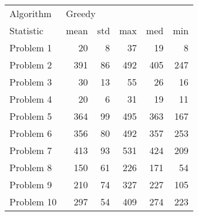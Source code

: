 \begin{tabular}{lrrrrr}
\toprule
Algorithm & \multicolumn{5}{l}{Greedy} \\
Statistic &   mean & std &  max &  med &  min \\
\midrule
Problem 1  &     20 &   8 &   37 &   19 &    8 \\
Problem 2  &    391 &  86 &  492 &  405 &  247 \\
Problem 3  &     30 &  13 &   55 &   26 &   16 \\
Problem 4  &     20 &   6 &   31 &   19 &   11 \\
Problem 5  &    364 &  99 &  495 &  363 &  167 \\
Problem 6  &    356 &  80 &  492 &  357 &  253 \\
Problem 7  &    413 &  93 &  531 &  424 &  209 \\
Problem 8  &    150 &  61 &  226 &  171 &   54 \\
Problem 9  &    210 &  74 &  327 &  227 &  105 \\
Problem 10 &    297 &  54 &  409 &  274 &  223 \\
\bottomrule
\end{tabular}
